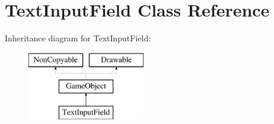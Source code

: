 \hypertarget{class_text_input_field}{\section{Text\-Input\-Field Class Reference}
\label{class_text_input_field}
}
Inheritance diagram for Text\-Input\-Field\-:\begin{figure}[H]
\begin{center}
\leavevmode
\includegraphics[height=3.000000cm]{class_text_input_field}
\end{center}
\end{figure}
